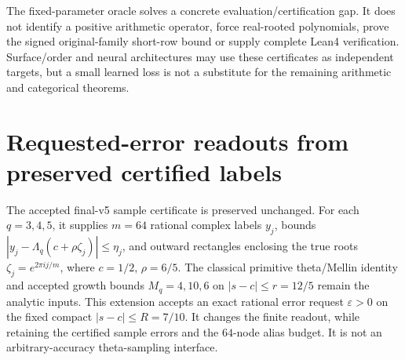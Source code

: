 \documentclass[11pt]{article}
\theoremstyle{definition}\newtheorem{definition}[theorem]{Definition}
\theoremstyle{remark}\newtheorem{remark}[theorem]{Remark}
\begin{document}
The fixed-parameter oracle solves a concrete evaluation/certification gap.
It does not identify a positive arithmetic operator, force real-rooted
polynomials, prove the signed original-family short-row bound or supply
complete Lean4 verification. Surface/order and neural architectures may use
these certificates as independent targets, but a small learned loss is not a
substitute for the remaining arithmetic and categorical theorems.

\section{Requested-error readouts from preserved certified labels}\label{ar:requested}
The accepted final-v5 sample certificate is preserved unchanged. For each
$q=3,4,5$, it supplies $m=64$ rational complex labels $y_j$, bounds
$|y_j-\Lambda_q(c+\rho\zeta_j)|\le\eta_j$, and outward rectangles enclosing
the true roots $\zeta_j=e^{2\pi i j/m}$, where $c=1/2$, $\rho=6/5$.
The classical primitive theta/Mellin identity and accepted growth bounds
$M_q=4,10,6$ on $|s-c|\le r=12/5$ remain the analytic inputs.
This extension accepts an exact rational error request $\varepsilon>0$ on
the fixed compact $|s-c|\le R=7/10$. It changes the finite readout, while
retaining the certified sample errors and the $64$-node alias budget.
It is not an arbitrary-accuracy theta-sampling interface.
\end{document}
